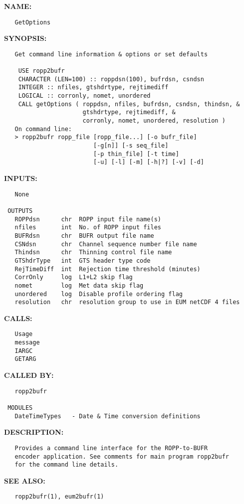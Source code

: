 \label{ch:robo101}
\label{ch:ropp2bufr_GetOptions}
\textbf{NAME:}\hspace{0.08in}\begin{Verbatim}
   GetOptions
\end{Verbatim}
\textbf{SYNOPSIS:}\hspace{0.08in}\begin{Verbatim}
   Get command line information & options or set defaults

    USE ropp2bufr
    CHARACTER (LEN=100) :: roppdsn(100), bufrdsn, csndsn
    INTEGER :: nfiles, gtshdrtype, rejtimediff
    LOGICAL :: corronly, nomet, unordered
    CALL getOptions ( roppdsn, nfiles, bufrdsn, csndsn, thindsn, &
                      gtshdrtype, rejtimediff, &
                      corronly, nomet, unordered, resolution )
   On command line:
   > ropp2bufr ropp_file [ropp_file...] [-o bufr_file]
                         [-g[n]] [-s seq_file]
                         [-p thin_file] [-t time] 
                         [-u] [-l] [-m] [-h|?] [-v] [-d]
\end{Verbatim}
\textbf{INPUTS:}\hspace{0.08in}\begin{Verbatim}
   None

 OUTPUTS
   ROPPdsn      chr  ROPP input file name(s)
   nfiles       int  No. of ROPP input files
   BUFRdsn      chr  BUFR output file name
   CSNdsn       chr  Channel sequence number file name
   Thindsn      chr  Thinning control file name
   GTShdrType   int  GTS header type code
   RejTimeDiff  int  Rejection time threshold (minutes)
   CorrOnly     log  L1+L2 skip flag
   nomet        log  Met data skip flag
   unordered    log  Disable profile ordering flag
   resolution   chr  resolution group to use in EUM netCDF 4 files
\end{Verbatim}
\textbf{CALLS:}\hspace{0.08in}\begin{Verbatim}
   Usage
   message
   IARGC
   GETARG
\end{Verbatim}
\textbf{CALLED BY:}\hspace{0.08in}\begin{Verbatim}
   ropp2bufr

 MODULES
   DateTimeTypes   - Date & Time conversion definitions
\end{Verbatim}
\textbf{DESCRIPTION:}\hspace{0.08in}\begin{Verbatim}
   Provides a command line interface for the ROPP-to-BUFR
   encoder application. See comments for main program ropp2bufr
   for the command line details.
\end{Verbatim}
\textbf{SEE ALSO:}\hspace{0.08in}\begin{Verbatim}
   ropp2bufr(1), eum2bufr(1)
\end{Verbatim}
